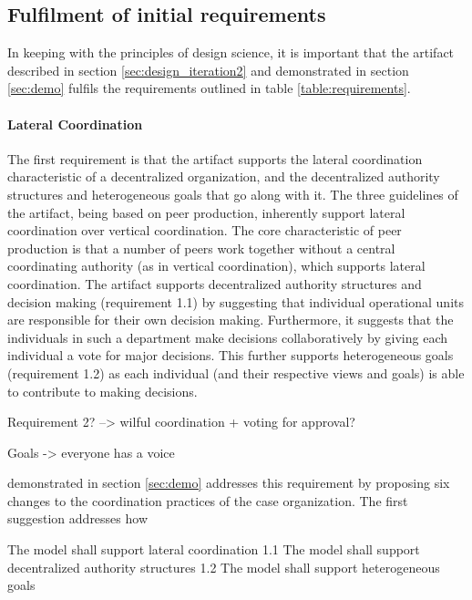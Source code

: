 \subsection{Fulfilment of initial requirements}

In keeping with the principles of design science, it is important that the artifact described in section \ref{sec:design_iteration2} and demonstrated in section \ref{sec:demo} fulfils the requirements outlined in table \ref{table:requirements}. 

\paragraph{Lateral Coordination}

The first requirement is that the artifact supports the lateral coordination characteristic of a decentralized organization, and the decentralized authority structures and heterogeneous goals that go along with it. The three guidelines of the artifact, being based on peer production, inherently support lateral coordination over vertical coordination. The core characteristic of peer production is that a number of peers work together without a central coordinating authority (as in vertical coordination), which supports lateral coordination. The artifact supports decentralized authority structures and decision making (requirement 1.1) by suggesting that individual operational units are responsible for their own decision making. Furthermore, it suggests that the individuals in such a department make decisions collaboratively by giving each individual a vote for major decisions. This further supports heterogeneous goals (requirement 1.2) as each individual (and their respective views and goals) is able to contribute to making decisions.

Requirement 2? --> wilful coordination + voting for approval?


Goals -> everyone has a voice

demonstrated in section \ref{sec:demo} addresses this requirement by proposing six changes to the coordination practices of the case organization. The first suggestion addresses how 
  
The   model  shall  support  lateral coordination
1.1 The model shall support decentralized authority structures
1.2 The model shall support heterogeneous goals

